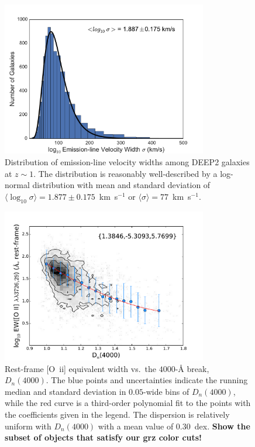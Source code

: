 \documentclass[11pt]{article}
\newcommand{\oii}{[O~{\sc ii}]}
\newcommand{\kms}{km~s$^{-1}$}
\begin{document}
\begin{figure}
\centering
\includegraphics[width=0.8\textwidth]{figures/linesigma.pdf}
\caption{Distribution of emission-line velocity widths among DEEP2 galaxies at
  $z\sim1$.  The distribution is reasonably well-described by a log-normal
  distribution with mean and standard deviation of
  $\langle\log_{10}\sigma\rangle=1.877\pm0.175$~\kms{} or
  $\langle\sigma\rangle=77$~\kms.  \label{fig:linesigma}}
\end{figure}

\begin{figure}
\centering
\includegraphics[width=0.8\textwidth]{figures/d4000_ewoii.pdf}
\caption{Rest-frame \oii{} equivalent width vs.~the $4000$-\AA{}
  break, $D_{n}(4000)$.  The blue points and uncertainties indicate
  the running median and standard deviation in $0.05$-wide bins of
  $D_{n}(4000)$, while the red curve is a third-order polynomial fit
  to the points with the coefficients given in the
  legend.  The dispersion is relatively uniform with $D_{n}(4000)$
  with a mean value of $0.30$~dex.  {\bf Show the subset of objects
    that satisfy our grz color cuts!}  \label{fig:d4000}}
\end{figure}
\end{document}
